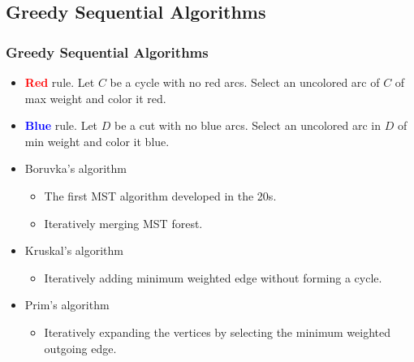 \subsection{Greedy Sequential Algorithms}

\begin{frame}
\frametitle{Greedy Sequential Algorithms}

\begin{itemize}
\item \textcolor{red}{\textbf{Red}} rule. Let $C$ be a cycle with no red arcs. Select an uncolored arc of $C$ of max weight and color it red. 
\item \textcolor{blue}{\textbf{Blue}} rule. Let $D$ be a cut with no blue arcs. Select an uncolored arc in $D$ of min weight and color it blue.
\end{itemize}
\begin{itemize}
  \item Boruvka's algorithm
    \begin{itemize}
      \item The first MST algorithm developed in the 20s.
      \item Iteratively merging MST forest.
    \end{itemize}
  \item Kruskal's algorithm
    \begin{itemize} 
      \item Iteratively adding minimum weighted edge without forming a cycle.
    \end{itemize}
  \item Prim's algorithm
    \begin{itemize} 
      \item Iteratively expanding the vertices by selecting the minimum weighted outgoing edge.
    \end{itemize}
\end{itemize}
\end{frame}


\begin{frame}
\end{frame}